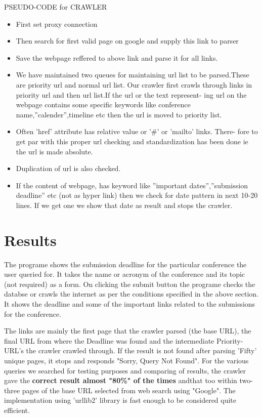 \documentclass[]{article}
\begin{document}
\begin{algorithm}
\caption{PSEUDO-CODE for CRAWLER}
\begin{itemize}
	\item First set proxy connection
	\item Then search for first valid page on google and supply this link to parser
	\item Save the webpage reffered to above link and parse it for all links.
	\item We have maintained two queues for maintaining url list to be parsed.These
are priority url and normal url list. Our crawler first crawls through
links in priority url and then url list.If the url or the text represent-
ing url on the webpage contains some specific keywords like conference
name,”calender”,timeline etc then the url is moved to priority list.
	\item Often ’href’ attribute has relative value or ’\#’ or ’mailto’ links. There-
fore to get par with this proper url checking and standardization has
been done ie the url is made absolute.
	\item Duplication of url is also checked.
	\item If the content of webpage, has keyword like ”important dates”,”submission
deadline” etc (not as hyper link) then we check for date pattern in next 10-20 lines. If we get one we show that date as result and stops the crawler.
\end{itemize}
\end{algorithm}


\section{Results}
The programe shows the submission deadline for the particular conference the user queried for. It takes the name or acronym of the conference and its topic (not required) as a form. On clicking the submit button the programe checks the databse or crawls the internet as per the conditions specified in the above section. It shows the deadline and some of the important links related to the submissions for the conference.

The links are mainly the first page that the crawler parsed (the base URL), the final URL from where the Deadline was found and the intermediate Priority-URL's the crawler crawled through.
If the result is not found after parsing 'Fifty' unique pages, it stops and responds "Sorry, Query Not Found".
For the various queries we searched for testing purposes and comparing of results, the crawler gave the \textbf{correct result almost "80\%" of the times} andthat too within two-three pages of the base URL selected from web search using "Google". The implementation using 'urllib2' \cite{urllib2} library is fast enough to be considered quite efficient. 
\end{document}

